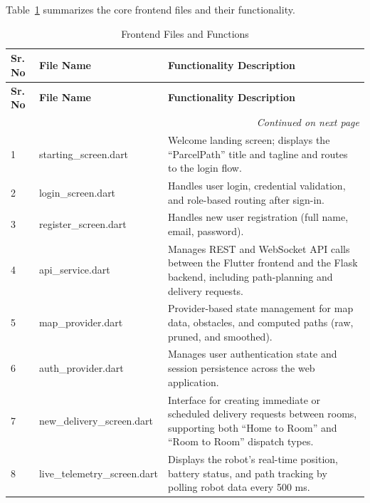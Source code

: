 Table~\ref{tab:frontend_files} summarizes the core frontend files and their functionality.
\begin{longtable}{|p{1cm}|p{4.3cm}|p{8.2cm}|}
	\caption{Frontend Files and Functions}
	\label{tab:frontend_files}\\
	
	\hline
	\textbf{Sr. No} & \textbf{File Name} & \textbf{Functionality Description} \\
	\hline
	\endfirsthead
	
	\hline
	\textbf{Sr. No} & \textbf{File Name} & \textbf{Functionality Description} \\
	\hline
	\endhead
	
	\hline
	\multicolumn{3}{|r|}{\textit{Continued on next page}} \\
	\hline
	\endfoot
	
	\hline
	\endlastfoot
	
	1 & starting\_screen.dart & Welcome landing screen; displays the ``ParcelPath'' title and tagline and routes to the login flow. \\
	\hline
	
	2 & login\_screen.dart & Handles user login, credential validation, and role-based routing after sign-in. \\
	\hline
	
	3 & register\_screen.dart & Handles new user registration (full name, email, password). \\
	\hline
	
	4 & api\_service.dart & Manages REST and WebSocket API calls between the Flutter frontend and the Flask backend, including path-planning and delivery requests. \\
	\hline
	
	5 & map\_provider.dart & Provider-based state management for map data, obstacles, and computed paths (raw, pruned, and smoothed). \\
	\hline
	
	6 & auth\_provider.dart & Manages user authentication state and session persistence across the web application. \\
	\hline
	
	7 & new\_delivery\_screen.dart & Interface for creating immediate or scheduled delivery requests between rooms, supporting both ``Home to Room'' and ``Room to Room'' dispatch types. \\
	\hline
	
	8 & live\_telemetry\_screen.dart & Displays the robot's real-time position, battery status, and path tracking by polling robot data every 500 ms. \\
	\hline
	

\end{longtable}
